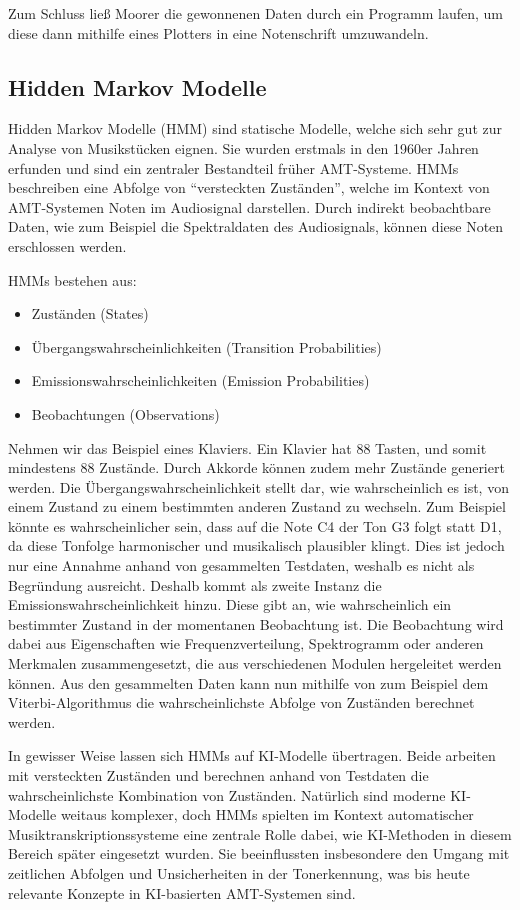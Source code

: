 Zum Schluss ließ Moorer die gewonnenen Daten durch ein Programm laufen, 
um diese dann mithilfe eines Plotters in eine Notenschrift umzuwandeln.

\subsection{Hidden Markov Modelle}\label{subsec:hiddenMarkov}
Hidden Markov Modelle (HMM) sind statische Modelle, welche sich sehr gut zur Analyse von Musikstücken eignen.
Sie wurden erstmals in den 1960er Jahren erfunden \cite{baum1970maximization} und
sind ein zentraler Bestandteil früher AMT-Systeme.
HMMs beschreiben eine Abfolge von \enquote{versteckten Zuständen},
welche im Kontext von AMT-Systemen Noten im Audiosignal darstellen.
Durch indirekt beobachtbare Daten, wie zum Beispiel die Spektraldaten des Audiosignals,
können diese Noten erschlossen werden.

HMMs bestehen aus:
\begin{itemize}
    \item Zuständen (States)
    \item Übergangswahrscheinlichkeiten (Transition Probabilities)
    \item Emissionswahrscheinlichkeiten (Emission Probabilities)
    \item Beobachtungen (Observations)
\end{itemize}
Nehmen wir das Beispiel eines Klaviers.
Ein Klavier hat 88 Tasten, und somit mindestens 88 Zustände.
Durch Akkorde können zudem mehr Zustände generiert werden.
Die Übergangswahrscheinlichkeit stellt dar,
wie wahrscheinlich es ist, von einem Zustand zu einem bestimmten anderen Zustand zu wechseln.
Zum Beispiel könnte es wahrscheinlicher sein, dass auf die Note C4 der Ton G3 folgt statt D1,
da diese Tonfolge harmonischer und musikalisch plausibler klingt.
Dies ist jedoch nur eine Annahme anhand von gesammelten Testdaten, weshalb es nicht als Begründung ausreicht.
Deshalb kommt als zweite Instanz die Emissionswahrscheinlichkeit hinzu.
Diese gibt an, wie wahrscheinlich ein bestimmter Zustand in der momentanen Beobachtung ist.
Die Beobachtung wird dabei aus Eigenschaften wie Frequenzverteilung,
Spektrogramm oder anderen Merkmalen zusammengesetzt, die aus verschiedenen Modulen hergeleitet werden können.
Aus den gesammelten Daten kann nun mithilfe von zum Beispiel dem Viterbi-Algorithmus \cite{takeda2002hidden} die
wahrscheinlichste Abfolge von Zuständen berechnet werden.

In gewisser Weise lassen sich HMMs auf KI-Modelle übertragen.
Beide arbeiten mit versteckten Zuständen und
berechnen anhand von Testdaten die wahrscheinlichste Kombination von Zuständen.
Natürlich sind moderne KI-Modelle weitaus komplexer,
doch HMMs spielten im Kontext automatischer Musiktranskriptionssysteme eine zentrale Rolle dabei,
wie KI-Methoden in diesem Bereich später eingesetzt wurden.
Sie beeinflussten insbesondere den Umgang mit zeitlichen Abfolgen
und Unsicherheiten in der Tonerkennung,
was bis heute relevante Konzepte in KI-basierten AMT-Systemen sind.

